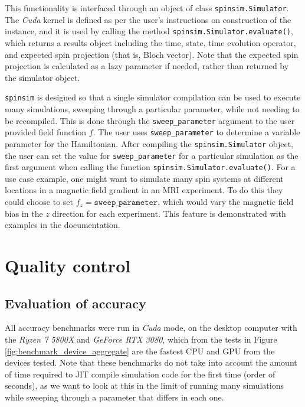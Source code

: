 \documentclass{jors}
\begin{document}
		This functionality is interfaced through an object of class \texttt{spinsim.Simulator}. The \emph{Cuda} kernel is defined as per the user’s instructions on construction of the instance, and it is used by calling the method \texttt{spinsim.Simulator.evaluate()}, which returns a results object including the time, state, time evolution operator, and expected spin projection (that is, Bloch vector). Note that the expected spin projection is calculated as a lazy parameter if needed, rather than returned by the simulator object.

		\texttt{spinsim} is designed so that a single simulator compilation can be used to execute many simulations, sweeping through a particular parameter, while not needing to be recompiled. This is done through the \texttt{sweep\_parameter} argument to the user provided field function \(f\). The user uses \texttt{sweep\_parameter} to determine a variable parameter for the Hamiltonian. After compiling the \texttt{spinsim.Simulator} object, the user can set the value for \texttt{sweep\_parameter} for a particular simulation as the first argument when calling the function \texttt{spinsim.Simulator.evaluate()}. For a use case example, one might want to simulate many spin systems at different locations in a magnetic field gradient in an MRI experiment. To do this they could choose to set \(f_z =\texttt{sweep\_parameter}\), which would vary the magnetic field bias in the \(z\) direction for each experiment. This feature is demonstrated with examples in the documentation.

\section{Quality control}
	\subsection{Evaluation of accuracy}
	All accuracy benchmarks were run in \emph{Cuda} mode, on the desktop computer with the \emph{Ryzen 7 5800X} and \emph{GeForce RTX 3080}, which from the tests in Figure \ref{fig:benchmark_device_aggregate} are the fastest CPU and GPU from the devices tested. Note that these benchmarks do not take into account the amount of time required to JIT compile simulation code for the first time (order of seconds), as we want to look at this in the limit of running many simulations while sweeping through a parameter that differs in each one.
	
\end{document}
